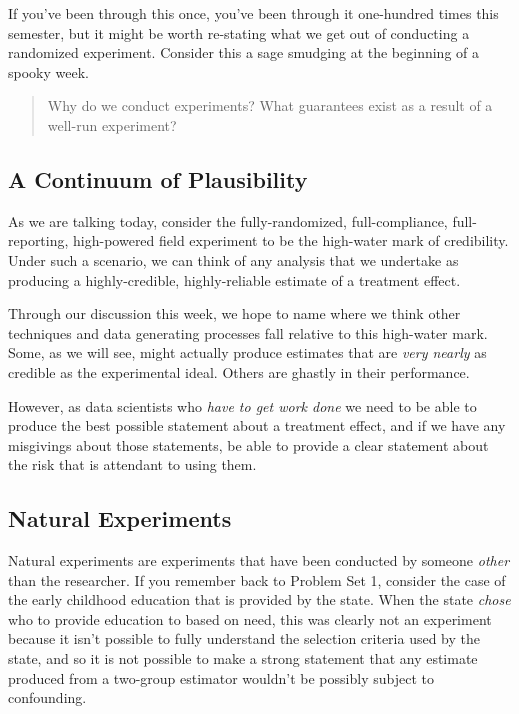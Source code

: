 \documentclass[
]{article}
\begin{document}
If you've been through this once, you've been through it one-hundred times this semester, but it might be worth re-stating what we get out of conducting a randomized experiment. Consider this a sage smudging at the beginning of a spooky week.

\begin{quote}
Why do we conduct experiments? What guarantees exist as a result of a well-run experiment?
\end{quote}

\hypertarget{a-continuum-of-plausibility}{%
\subsection{A Continuum of Plausibility}\label{a-continuum-of-plausibility}}

As we are talking today, consider the fully-randomized, full-compliance, full-reporting, high-powered field experiment to be the high-water mark of credibility. Under such a scenario, we can think of any analysis that we undertake as producing a highly-credible, highly-reliable estimate of a treatment effect.

Through our discussion this week, we hope to name where we think other techniques and data generating processes fall relative to this high-water mark. Some, as we will see, might actually produce estimates that are \emph{very nearly} as credible as the experimental ideal. Others are ghastly in their performance.

However, as data scientists who \emph{have to get work done} we need to be able to produce the best possible statement about a treatment effect, and if we have any misgivings about those statements, be able to provide a clear statement about the risk that is attendant to using them.

\hypertarget{natural-experiments}{%
\subsection{Natural Experiments}\label{natural-experiments}}

Natural experiments are experiments that have been conducted by someone \emph{other} than the researcher. If you remember back to Problem Set 1, consider the case of the early childhood education that is provided by the state. When the state \emph{chose} who to provide education to based on need, this was clearly not an experiment because it isn't possible to fully understand the selection criteria used by the state, and so it is not possible to make a strong statement that any estimate produced from a two-group estimator wouldn't be possibly subject to confounding.
\end{document}
